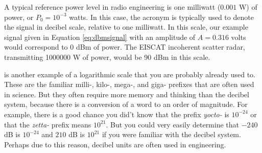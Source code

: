 A typical reference power level in radio engineering is one milliwatt
($0.001$ W) of power, or $P_0 = 10^{-3}$ watts. In this case, the
acronym  is typically used to denote the signal in
decibel scale, relative to one milliwatt. In this scale, our example
signal given in Equation \ref{eq:dbmsignal} with an amplitude of
$A=0.316$ volts would correspond to 0 dBm of power. The EISCAT
incoherent scatter radar, transmitting 1000000 W of power, would be 90
dBm in this scale.

 is another example of a
logarithmic scale that you are probably already used to. These are the
familiar milli-, kilo-, mega-, and giga- prefixes that are often used
in science. But they often require more memory and thinking than the
decibel system, because there is a conversion of a word to an order of
magnitude. For example, there is a good chance you did't know that the
prefix \emph{yocto-} is $10^{-24}$ or that the \emph{zetta-} prefix
means $10^{21}$. But you could very easily determine that $-240$ dB is
$10^{-24}$ and $210$ dB is $10^{21}$ if you were familiar with the
decibel system. Perhaps due to this reason, decibel units are often
used in engineering.



